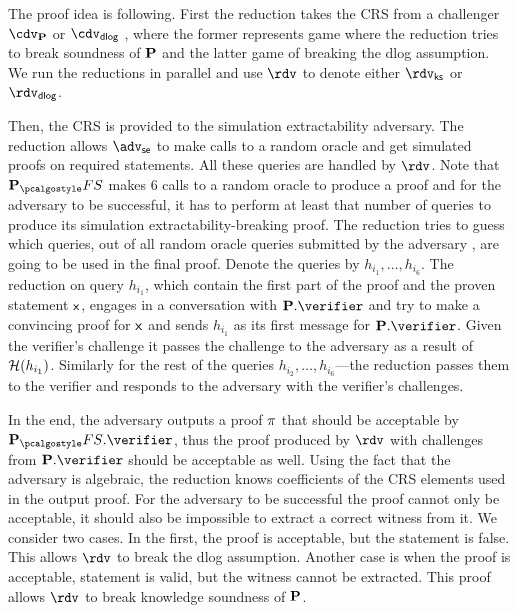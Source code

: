 \documentclass[runningheads,11pt]{llncs}
\theoremstyle{definition}
\begin{document}
The proof idea is following. First the reduction takes the CRS from a challenger
$\cdv_\plonkprot$ or $\cdv_\dlog$ 
	, where the former represents game where the reduction tries to break soundness of $\mathbf{P}$ and the latter game of breaking the dlog assumption. We run the reductions in parallel and use $\rdv$ to denote either $\rdvks$ or $\rdvdlog$.

Then, the CRS is provided to the simulation extractability adversary. The reduction allows $\advse$ to make calls to a random oracle and get simulated proofs on required statements. All these queries are handled by $\rdv$.
Note that $\plonkprotfs$ makes $6$ calls to a random oracle to produce a proof
and for the adversary to be successful, it has to perform at least that number
of queries to produce its simulation extractability-breaking
proof.
	 The reduction tries to guess which queries,
out of all random oracle queries submitted by the adversary
, are going to be used in the final proof. Denote the queries by $h_{i_1}, \ldots, h_{i_6}$. 
The reduction on query $h_{i_1}$, which contain the first part of the proof and the proven statement $\mathsf{x}$, engages in a conversation with $\plonkprot.\verifier$ and try to make a convincing proof for $\mathsf{x}$ and sends $h_{i_1}$ as its first message for $\plonkprot.\verifier$. Given the verifier's challenge it passes the challenge to the adversary as a result of $\mathcal{H}(h_{i_1})$. 
Similarly for the rest of the queries $h_{i_2}, \ldots, h_{i_6}$---the reduction passes them to the verifier and responds to the adversary with the verifier's challenges.

In the end, the adversary outputs a proof $\pi$ that should be acceptable
by $\plonkprotfs.\verifier$, thus the proof produced by $\rdv$ with challenges
from $\plonkprot.\verifier$ should be acceptable as well. Using the fact that
the adversary is algebraic, the reduction knows coefficients of the CRS elements
used in the output proof. For the adversary to be successful the proof cannot
only be acceptable, it should also be impossible to extract a correct witness
from it. We consider two cases. In the first, the proof is acceptable, but the
statement is false. This allows $\rdv$ to break the dlog assumption.
 Another case is when the proof is acceptable, statement is valid, but the witness cannot be extracted. This proof allows $\rdv$ to break knowledge soundness of $\mathbf{P}$.
\end{document}
